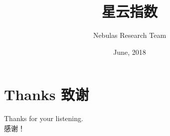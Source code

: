 \documentclass[10pt, mathserif]{beamer} %
\begin{document}
\title[abbreviation]{ 星云指数}
\author{ Nebulas Research Team}

\date{June, 2018}


\begin{frame}
    \titlepage	%
\end{frame}








\section{Thanks 致谢}
\begin{frame}
	Thanks for your listening. \\
	感谢！
\end{frame}
\end{document}
